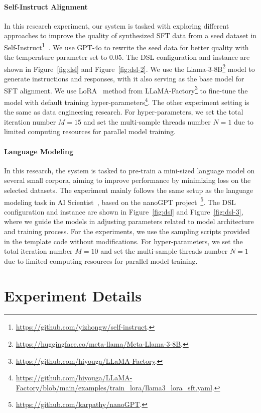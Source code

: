 \documentclass{article} %
\newcommand{\DSL}{\textsc{DSL}\xspace}
\begin{document}
\paragraph{Self-Instruct Alignment}
In this research experiment, our system is tasked with exploring different approaches to improve the quality of synthesized SFT data from a seed dataset in Self-Instruct\footnote{\url{https://github.com/yizhongw/self-instruct}.}~\citep{wang-etal-2023-self-instruct}. We use GPT-4o to rewrite the seed data for better quality with the temperature parameter set to 0.05. The \DSL configuration and instance are shown in Figure~\ref{fig:dsl} and Figure~\ref{fig:dsl-2}. We use the Llama-3-8B\footnote{\url{https://huggingface.co/meta-llama/Meta-Llama-3-8B}.} model to generate instructions and responses, with it also serving as the base model for SFT alignment. We use LoRA~\citep{hu2022lora} method from LLaMA-Factory\footnote{\url{https://github.com/hiyouga/LLaMA-Factory}.} to fine-tune the model with default training hyper-parameters\footnote{\url{https://github.com/hiyouga/LLaMA-Factory/blob/main/examples/train_lora/llama3_lora_sft.yaml}.}. The other experiment setting is the same as data engineering research. For hyper-parameters, we set the total iteration number $M=15$ and set the multi-sample threads number $N=1$ due to limited computing resources for parallel model training.

\paragraph{Language Modeling}
In this research, the system is tasked to pre-train a mini-sized language model on several small corpora, aiming to improve performance by minimizing loss on the selected datasets. The experiment mainly follows the same setup as the language modeling task in AI Scientist~\citep{lu2024aiscientist}, based on the nanoGPT project~\footnote{\url{https://github.com/karpathy/nanoGPT}.}. The \DSL configuration and instance are shown in Figure~\ref{fig:dsl} and Figure~\ref{fig:dsl-3}, where we guide the models in adjusting parameters related to model architecture and training process. For the experiments, we use the sampling scripts provided in the template code without modifications. For hyper-parameters, we set the total iteration number $M=10$ and set the multi-sample threads number $N=1$ due to limited computing resources for parallel model training.

\section{Experiment Details}\label{app:exp-detail}
\end{document}
